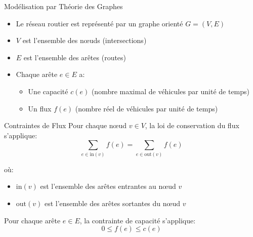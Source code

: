 \documentclass{beamer}
\begin{document}
\begin{frame}{Modélisation par Théorie des Graphes}
\begin{itemize}
    \item Le réseau routier est représenté par un graphe orienté $G = (V, E)$
    \item $V$ est l'ensemble des nœuds (intersections)
    \item $E$ est l'ensemble des arêtes (routes)
    \item Chaque arête $e \in E$ a:
    \begin{itemize}
        \item Une capacité $c(e)$ (nombre maximal de véhicules par unité de temps)
        \item Un flux $f(e)$ (nombre réel de véhicules par unité de temps)
    \end{itemize}
\end{itemize}

\begin{center}
\end{center}
\end{frame}

\begin{frame}{Contraintes de Flux}
Pour chaque nœud $v \in V$, la loi de conservation du flux s'applique:
\begin{equation}
\sum_{e \in \text{in}(v)} f(e) = \sum_{e \in \text{out}(v)} f(e)
\end{equation}

où:
\begin{itemize}
    \item $\text{in}(v)$ est l'ensemble des arêtes entrantes au nœud $v$
    \item $\text{out}(v)$ est l'ensemble des arêtes sortantes du nœud $v$
\end{itemize}

Pour chaque arête $e \in E$, la contrainte de capacité s'applique:
\begin{equation}
0 \leq f(e) \leq c(e)
\end{equation}
\end{frame}
\end{document}
